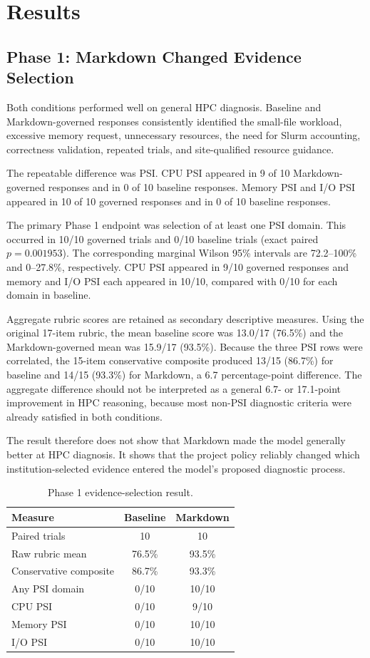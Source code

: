 \documentclass[11pt]{article}
\begin{document}
\section{Results}

\subsection{Phase 1: Markdown Changed Evidence Selection}

Both conditions performed well on general HPC diagnosis. Baseline and Markdown-governed responses consistently identified the small-file workload, excessive memory request, unnecessary resources, the need for Slurm accounting, correctness validation, repeated trials, and site-qualified resource guidance.

The repeatable difference was PSI. CPU PSI appeared in 9 of 10 Markdown-governed responses and in 0 of 10 baseline responses. Memory PSI and I/O PSI appeared in 10 of 10 governed responses and in 0 of 10 baseline responses.

The primary Phase 1 endpoint was selection of at least one PSI domain. This occurred in 10/10 governed trials and 0/10 baseline trials (exact paired $p=0.001953$). The corresponding marginal Wilson 95\% intervals are 72.2--100\% and 0--27.8\%, respectively. CPU PSI appeared in 9/10 governed responses and memory and I/O PSI each appeared in 10/10, compared with 0/10 for each domain in baseline.

Aggregate rubric scores are retained as secondary descriptive measures. Using the original 17-item rubric, the mean baseline score was 13.0/17 (76.5\%) and the Markdown-governed mean was 15.9/17 (93.5\%). Because the three PSI rows were correlated, the 15-item conservative composite produced 13/15 (86.7\%) for baseline and 14/15 (93.3\%) for Markdown, a 6.7 percentage-point difference. The aggregate difference should not be interpreted as a general 6.7- or 17.1-point improvement in HPC reasoning, because most non-PSI diagnostic criteria were already satisfied in both conditions.

The result therefore does not show that Markdown made the model generally better at HPC diagnosis. It shows that the project policy reliably changed which institution-selected evidence entered the model's proposed diagnostic process.

\begin{table}[H]
\centering
\caption{Phase 1 evidence-selection result.}
\begin{tabular}{lcc}
\toprule
\textbf{Measure} & \textbf{Baseline} & \textbf{Markdown} \\
\midrule
Paired trials & 10 & 10 \\
Raw rubric mean & 76.5\% & 93.5\% \\
Conservative composite & 86.7\% & 93.3\% \\
Any PSI domain & 0/10 & 10/10 \\
CPU PSI & 0/10 & 9/10 \\
Memory PSI & 0/10 & 10/10 \\
I/O PSI & 0/10 & 10/10 \\
\bottomrule
\end{tabular}
\end{table}
\end{document}
